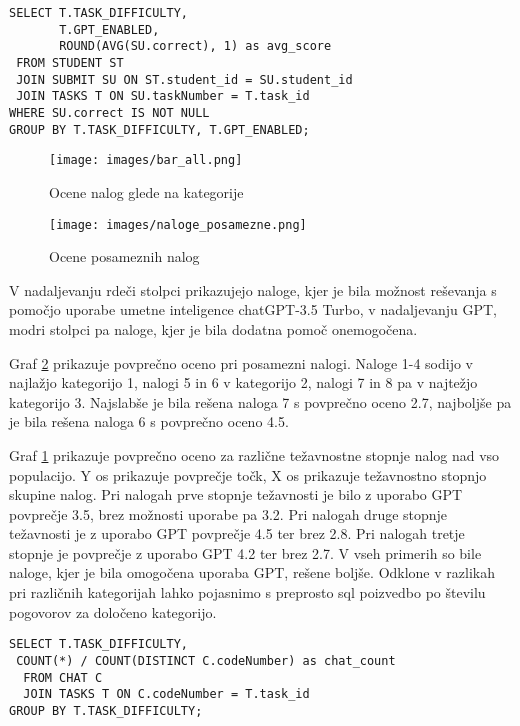 \documentclass[a4paper,12pt,openright]{book}
\begin{document}
\begin{lstlisting}
SELECT T.TASK_DIFFICULTY,
       T.GPT_ENABLED,
       ROUND(AVG(SU.correct), 1) as avg_score
 FROM STUDENT ST
 JOIN SUBMIT SU ON ST.student_id = SU.student_id
 JOIN TASKS T ON SU.taskNumber = T.task_id
WHERE SU.correct IS NOT NULL
GROUP BY T.TASK_DIFFICULTY, T.GPT_ENABLED;
\end{lstlisting}

\begin{figure}[H]
    \centering
    \texttt{[image: images/bar\_all.png]}
    \caption{Ocene nalog glede na kategorije}
    \label{fig:bar_all}
\end{figure}

\begin{figure}[H]
    \centering
    \texttt{[image: images/naloge\_posamezne.png]}
    \caption{Ocene posameznih nalog}
    \label{fig:grade_all}
\end{figure}
 V nadaljevanju rdeči stolpci prikazujejo naloge, kjer je bila možnost reševanja s pomočjo uporabe umetne inteligence chatGPT-3.5 Turbo, v nadaljevanju GPT, modri stolpci pa naloge, kjer je bila dodatna pomoč onemogočena.

Graf \ref{fig:grade_all} prikazuje povprečno oceno pri posamezni nalogi. Naloge 1-4 sodijo v najlažjo kategorijo 1, nalogi 5 in 6 v kategorijo 2, nalogi 7 in 8 pa v najtežjo kategorijo 3. Najslabše je bila rešena naloga 7 s povprečno oceno 2.7, najboljše pa je bila rešena naloga 6 s povprečno oceno 4.5.


Graf \ref{fig:bar_all} prikazuje povprečno oceno za različne težavnostne stopnje nalog nad vso populacijo. Y os prikazuje povprečje točk, X os prikazuje težavnostno stopnjo skupine nalog.
Pri nalogah prve stopnje težavnosti je bilo z uporabo GPT povprečje 3.5, brez možnosti uporabe pa 3.2. Pri nalogah druge stopnje težavnosti je z uporabo GPT povprečje 4.5 ter brez 2.8. Pri nalogah tretje stopnje je povprečje z uporabo GPT 4.2 ter brez 2.7. V vseh primerih so bile naloge, kjer je bila omogočena uporaba GPT, rešene boljše. 
Odklone v razlikah pri različnih kategorijah lahko pojasnimo s preprosto sql poizvedbo po številu pogovorov za določeno kategorijo.

\begin{lstlisting}
SELECT T.TASK_DIFFICULTY,
 COUNT(*) / COUNT(DISTINCT C.codeNumber) as chat_count
  FROM CHAT C
  JOIN TASKS T ON C.codeNumber = T.task_id
GROUP BY T.TASK_DIFFICULTY;
\end{lstlisting}
\end{document}
